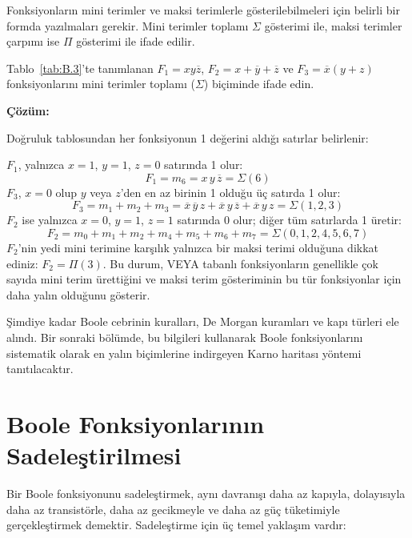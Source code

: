Fonksiyonların mini terimler ve maksi terimlerle gösterilebilmeleri için belirli bir formda yazılmaları gerekir. Mini terimler toplamı $\Sigma$ gösterimi ile, maksi terimler çarpımı ise $\Pi$ gösterimi ile ifade edilir.

\begin{ornek}[B.3]
Tablo~\ref{tab:B.3}'te tanımlanan $F_1 = x y \overline{z}$, $F_2 = x + \overline{y} + \overline{z}$ ve $F_3 = \overline{x}(y + z)$ fonksiyonlarını mini terimler toplamı ($\Sigma$) biçiminde ifade edin.

\textbf{Çözüm:}

Doğruluk tablosundan her fonksiyonun 1 değerini aldığı satırlar belirlenir:

$F_1$, yalnızca $x=1$, $y=1$, $z=0$ satırında 1 olur:
\[
    F_1 = m_6 = x\,y\,\overline{z} = \Sigma(6)
\]
$F_3$, $x=0$ olup $y$ veya $z$'den en az birinin 1 olduğu üç satırda 1 olur:
\[
    F_3 = m_1 + m_2 + m_3 = \overline{x}\,\overline{y}\,z + \overline{x}\,y\,\overline{z} + \overline{x}\,y\,z = \Sigma(1,2,3)
\]
$F_2$ ise yalnızca $x=0$, $y=1$, $z=1$ satırında 0 olur; diğer tüm satırlarda 1 üretir:
\[
    F_2 = m_0 + m_1 + m_2 + m_4 + m_5 + m_6 + m_7 = \Sigma(0,1,2,4,5,6,7)
\]
$F_2$'nin yedi mini terimine karşılık yalnızca bir maksi terimi olduğuna dikkat ediniz: $F_2 = \Pi(3)$. Bu durum, VEYA tabanlı fonksiyonların genellikle çok sayıda mini terim ürettiğini ve maksi terim gösteriminin bu tür fonksiyonlar için daha yalın olduğunu gösterir.
\end{ornek}

Şimdiye kadar Boole cebrinin kuralları, De Morgan kuramları ve kapı türleri ele alındı. Bir sonraki bölümde, bu bilgileri kullanarak Boole fonksiyonlarını sistematik olarak en yalın biçimlerine indirgeyen Karno haritası yöntemi tanıtılacaktır.

\section{Boole Fonksiyonlarının Sadeleştirilmesi}

Bir Boole fonksiyonunu sadeleştirmek, aynı davranışı daha az kapıyla, dolayısıyla daha az transistörle, daha az gecikmeyle ve daha az güç tüketimiyle gerçekleştirmek demektir. Sadeleştirme için üç temel yaklaşım vardır:


